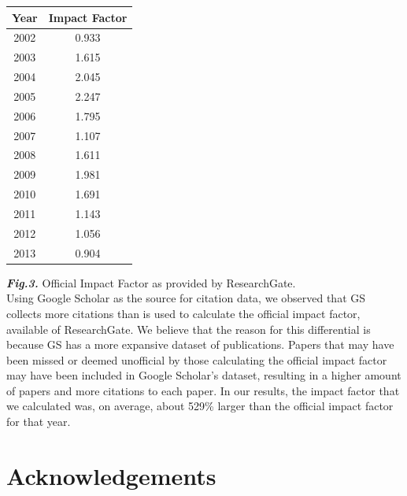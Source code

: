 \documentclass[jair,twoside,11pt,theapa]{article}
\begin{document}
\begin{center}
\begin{tabular}{| c | c |} 
 \hline
 Year & Impact Factor\\ 
 \hline\hline
 2002 &  0.933\\ 
 \hline
 2003 &  1.615\\
 \hline
 2004 &  2.045\\
 \hline
 2005 &  2.247\\
 \hline
 2006 &  1.795\\ 
 \hline
 2007 &  1.107\\ 
 \hline
 2008 &  1.611\\ 
 \hline
 2009 &  1.981\\ 
 \hline
 2010 &  1.691\\ 
 \hline
 2011 &  1.143\\ 
 \hline
 2012 &  1.056\\ 
 \hline
 2013 &  0.904\\ 
 \hline
\end{tabular}
\end{center}
\textbf{\textit{Fig.3.}}\hspace{.1cm} Official Impact Factor as provided by ResearchGate.\\


Using Google Scholar as the source for citation data, we observed that GS collects more citations than is used to calculate the official impact factor, available of ResearchGate. We believe that the reason for this differential is because GS has a more expansive dataset of publications. Papers that may have been missed or deemed unofficial by those calculating the official impact factor may have been included in Google Scholar's dataset, resulting in a higher amount of papers and more citations to each paper. In our results, the impact factor that we calculated was, on average, about 529\% larger than the official impact factor for that year. 



\section*{Acknowledgements}




\end{document}

